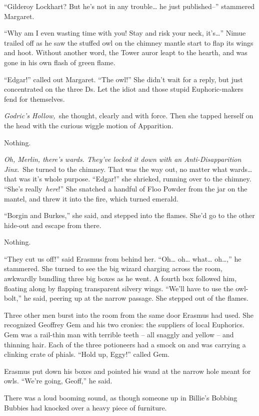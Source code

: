 ``Gilderoy Lockhart? But he's not in any trouble\ldots{} he just
published--'' stammered Margaret.

``Why am I even wasting time with you! Stay and risk your neck,
it's\ldots{}'' Nimue trailed off as he saw the stuffed owl on the
chimney mantle start to flap its wings and hoot. Without another word,
the Tower auror leapt to the hearth, and was gone in his own flash of
green flame.

``Edgar!'' called out Margaret. ``The owl!'' She didn't wait for a
reply, but just concentrated on the three Ds. Let the idiot and those
stupid Euphoric-makers fend for themselves.

\emph{Godric's Hollow,}~she thought, clearly and with force. Then she
tapped herself on the head with the curious wiggle motion of Apparition.

Nothing.

\emph{Oh, Merlin, there's wards. They've locked it down with an
Anti-Disapparition Jinx.}~She turned to the chimney. That was the way
out, no matter what wards\ldots{} that was it's whole purpose.
``Edgar!'' she shrieked, running over to the chimney. ``She's
really~\emph{here}!'' She snatched a handful of Floo Powder from the jar
on the mantel, and threw it into the fire, which turned emerald.

``Borgin and Burkes,'' she said, and stepped into the flames. She'd go
to the other hide-out and escape from there.

Nothing.

``They cut us off!'' said Erasmus from behind her. ``Oh\ldots{}
oh\ldots{} what\ldots{} oh\ldots,'' he stammered. She turned to see the
big wizard charging across the room, awkwardly bundling three big boxes
as he went. A fourth box followed him, floating along by flapping
transparent silvery wings. ``We'll have to use the owl-bolt,'' he said,
peering up at the narrow passage. She stepped out of the flames.

Three other men burst into the room from the same door Erasmus had used.
She recognized Geoffrey Gem and his two cronies: the suppliers of local
Euphorics. Gem was a rail-thin man with terrible teeth -- all snaggly
and yellow -- and thinning hair. Each of the three potioneers had a
smock on and was carrying a clinking crate of phials. ``Hold up, Eggy!''
called Gem.

Erasmus put down his boxes and pointed his wand at the narrow hole meant
for owls. ``We're going, Geoff,'' he said.

There was a loud booming sound, as though someone up in Billie's Bobbing
Bubbies had knocked over a heavy piece of furniture.

